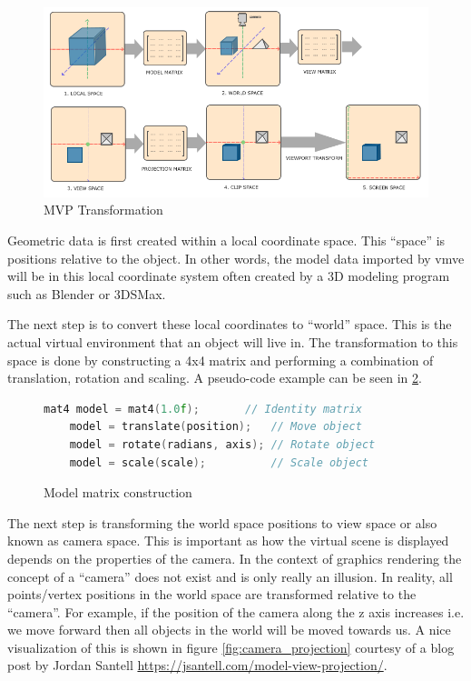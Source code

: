 \documentclass[11pt]{article}
\begin{document}
\begin{figure}[h!]
  \centering
  \includegraphics[width=\textwidth]{images/mvp.png}
  \caption{MVP Transformation \cite{coordinate_systems}}
  \label{fig:mvp_transformation} 
\end{figure}

Geometric data is first created within a local coordinate space. This ``space''
is positions relative to the object. In other words, the model data imported by
\gls{vmve} will be in this local coordinate system often created by a 3D modeling
program such as Blender or 3DSMax.

The next step is to convert these local coordinates to ``world'' space. This is
the actual virtual environment that an object will live in. The transformation
to this space is done by constructing a 4x4 matrix and performing a combination
of translation, rotation and scaling. A pseudo-code example can be seen in
\ref{fig:local_to_world}.

\begin{figure}[ht]
  \centering
  \begin{lstlisting}[language=C++]
    mat4 model = mat4(1.0f);       // Identity matrix
    model = translate(position);   // Move object
    model = rotate(radians, axis); // Rotate object
    model = scale(scale);          // Scale object
  \end{lstlisting}
  \caption{Model matrix construction}
  \label{fig:local_to_world}
\end{figure}
  

The next step is transforming the world space positions to view space or also
known as camera space. This is important as how the virtual scene is displayed
depends on the properties of the camera. In the context of graphics rendering
the concept of a ``camera'' does not exist and is only really an illusion. In
reality, all points/vertex positions in the world space are transformed relative
to the ``camera''. For example, if the position of the camera along the z axis
increases i.e. we move forward then all objects in the world will be moved
towards us. A nice visualization of this is shown in figure
\ref{fig:camera_projection} courtesy of a blog post by Jordan Santell
\href{https://jsantell.com/model-view-projection/}{https://jsantell.com/model-view-projection/}.
\end{document}
